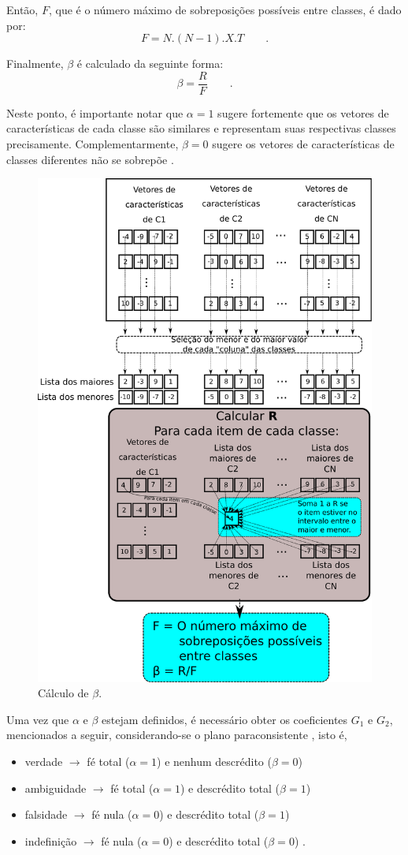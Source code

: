 				\par Então, $F$, que é o número máximo de sobreposições possíveis entre classes, é dado por:
				\begin{equation}
						F=N.(N-1).X.T \qquad.
				\end{equation}
				\par Finalmente, $\beta$ é calculado da seguinte forma:
				\begin{equation}
					\beta=\dfrac{R}{F} \qquad.
				\end{equation}
			
				\par Neste ponto, é importante notar que $\alpha=1$ sugere fortemente que os vetores de características de cada classe são similares e representam suas respectivas classes precisamente. Complementarmente, $\beta=0$ sugere os vetores de características de classes diferentes não se sobrepõe \cite{8588433}.
				
				\begin{figure}[h]
					\centering
		    	\includegraphics[width=0.55\linewidth]{images/betaCalculation.pdf}
					\caption{Cálculo de $\beta$.}
					\label{fig:betacalculation}
				\end{figure}
			
			\par Uma vez que $\alpha$ e $\beta$ estejam definidos, é necessário obter os coeficientes $G_1$ e $G_2$, mencionados a seguir, considerando-se o plano paraconsistente \cite{8588433}, isto é,  
				
				\begin{itemize}
					\item verdade $\rightarrow$ fé total ($\alpha = 1$) e nenhum descrédito ($\beta = 0$)
					\item ambiguidade $\rightarrow$ fé total ($\alpha = 1$) e descrédito total ($\beta = 1$)
					\item falsidade $\rightarrow$ fé nula ($\alpha = 0$) e descrédito total ($\beta = 1$)
					\item indefinição $\rightarrow$ fé nula ($\alpha = 0$) e descrédito total ($\beta = 0$) \qquad.
				\end{itemize}
				
